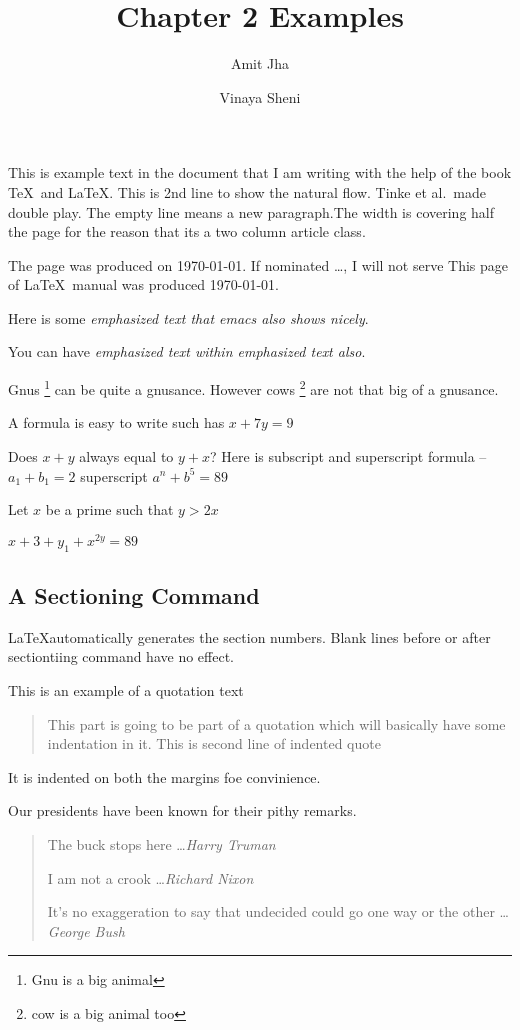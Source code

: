 \documentclass[twocolumn,12pt]{article}
\title{Chapter 2 Examples}
\author{Amit Jha \and Vinaya Sheni}
\begin{document}
\maketitle

This is example text in the document that I am writing with the help of the book \TeX \ and \LaTeX.
This is 2nd line to show the natural flow.
Tinke et al.\  made double play.
The empty line means a new paragraph.The width is covering half the page for the reason that its a two column article class.

The page was produced on \today.
If nominated \ldots, I will not serve
This page of \LaTeX\ manual was produced \today.


Here is some \emph{emphasized text that emacs also shows nicely}.

You can have \emph{emphasized text \emph{within} emphasized text also}.

Gnus \footnote{Gnu is a big animal} can be quite a gnusance.
However cows \footnote{cow is a big animal too} are not that big of a gnusance.


A formula is easy to write such has \(x+7y = 9\)

Does \(x  + y \) always equal to \(y+x\)?
Here is subscript and superscript formula -- \(a_1 + b_1 = 2\) superscript \(a^n + b^5 = 89\)

Let $x$ be a prime such that $y > 2x$

\begin{math} x + 3+ y_1 + x^{2y} = 89 \end{math}

\subsection{A Sectioning Command}
\LaTeX automatically generates the section numbers. Blank lines before or after sectiontiing command have no effect.

This is an example of a quotation text
\begin{quote}
  This part is going to be part of a quotation which will basically have some indentation in it.
  This is second line of indented quote
\end{quote}
It is indented on both the margins foe convinience.

Our presidents have been known for their pithy remarks.
\begin{quote}
  The buck stops here \ldots \emph{Harry Truman}

  I am not a crook \ldots \emph{Richard Nixon}

  It's no exaggeration to say that undecided could go one way or the other \ldots \emph{George Bush}
\end{quote}
\end{document}
